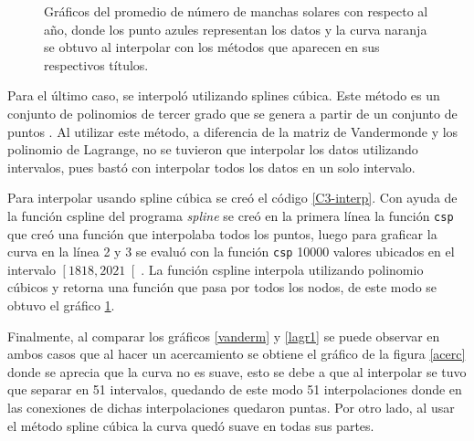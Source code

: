 \documentclass[../portafolio.tex]{subfiles}
\begin{document}
\begin{figure}[H]
\begin{subfigure}[b]{0.49\textwidth}
         \caption{}
         \label{sp}
     \end{subfigure}
    \caption{Gráficos del promedio de número de manchas solares con respecto al año, donde los punto azules representan los datos y la curva naranja se obtuvo al interpolar con los métodos que aparecen en sus respectivos títulos.}
    \label{--}
\end{figure}


Para el último caso, se interpoló utilizando splines cúbica. Este método es un conjunto de polinomios de tercer grado que se genera a partir de un conjunto de puntos \cite{spline}. Al utilizar este método, a diferencia de la matriz de Vandermonde y los polinomio de Lagrange, no se tuvieron que interpolar los datos utilizando intervalos, pues bastó con interpolar todos los datos en un solo intervalo. 

\vspace{2mm}
Para interpolar usando spline cúbica se creó el código \ref{C3-interp}. Con ayuda de la función cspline del programa \textit{spline} se creó en la primera línea la función \texttt{csp} que creó una función que interpolaba todos los puntos, luego para graficar la curva en la línea 2 y 3 se evaluó con la función \texttt{csp} 10000 valores ubicados en el intervalo $\left[1818,2021 \right[$. La función cspline interpola utilizando polinomio cúbicos y retorna una función que pasa por todos los nodos, de este modo se obtuvo el gráfico \ref{sp}.



\vspace{2mm}
Finalmente, al comparar los gráficos \ref{vanderm} y \ref{lagr1} se puede observar en ambos casos que al hacer un acercamiento se obtiene el gráfico de la figura \ref{acerc} donde se aprecia que la curva no es suave, esto se debe a que al interpolar se tuvo que separar en 51 intervalos, quedando de este modo 51 interpolaciones donde en las conexiones de dichas interpolaciones quedaron puntas. Por otro lado, al usar el método spline cúbica la curva quedó suave en todas sus partes.
\end{document}
